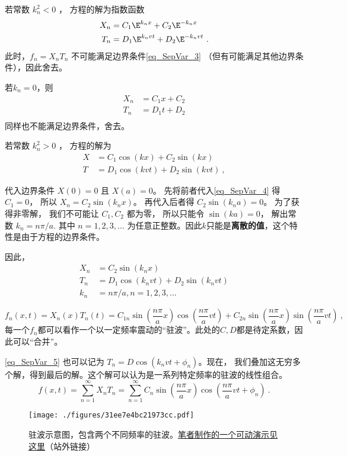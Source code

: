 若常数 $k_n^2 < 0$ ， 方程的解为指数函数
\begin{align}
X_n &= C_1 \E^{k_nx} + C_2 \E^{-k_nx}\\
T_n &= D_1 \E^{k_nvt} + D_2 \E^{-k_nvt}~.
\end{align}
此时，$f_n = X_nT_n$ 不可能满足边界条件\autoref{eq_SepVar_3}  （但有可能满足其他边界条件），因此舍去。

若$k_n=0$，则
\begin{align}
X_n &= C_1x+C_2\\
T_n &= D_1t+D_2\\
\end{align}
同样也不能满足边界条件，舍去。

若常数 $k_n^2 > 0$ ， 方程的解为
\begin{align}\label{eq_SepVar_4}
X &= C_1 \cos(kx) + C_2 \sin(kx)\\
T &= D_1 \cos(kvt) + D_2 \sin(kvt)~,
\end{align}

代入边界条件 $X(0) = 0$ 且 $X(a) = 0$。 先将前者代入\autoref{eq_SepVar_4} 得 $C_1 = 0$， 所以 $X_n = C_2\sin(k_nx)$。 再代入后者得 $C_2\sin(k_na) = 0$。 为了获得非零解， 我们不可能让 $C_1, C_2$ 都为零， 所以只能令 $\sin(ka) = 0$， 解出常数 $k_n = n\pi/a$. 其中 $n=1,2,3,...$ 为任意正整数。因此$k$只能是\textbf{离散的值}，这个特性是由于方程的边界条件。

因此，
\begin{align}
\label{eq_SepVar_5}X_n &= C_2 \sin(k_nx)\\
T_n &= D_1 \cos(k_nvt) + D_2 \sin(k_nvt)\\
k_n & = n\pi/a, n=1,2,3,...
\end{align}

\begin{equation}
f_n(x, t) = X_n(x) T_n(t) = C_{1n} \sin(\frac{n\pi}{a}x)\cos(\frac{n\pi}{a} vt) + C_{2n}\sin(\frac{n\pi}{a}x)\sin(\frac{n\pi}{a}vt)~,
\end{equation}
每一个$f_n$都可以看作一个以一定频率震动的“驻波”。此处的$C, D$都是待定系数，因此可以“合并”。

\autoref{eq_SepVar_5} 也可以记为 $T_n=D\cos(k_nvt+\phi_n)$。现在， 我们叠加这无穷多个解，得到最后的解。这个解可以认为是一系列特定频率的驻波的线性组合。
\begin{equation}
f(x, t) = \sum_{n=1}^\infty X_nT_n = \sum_{n=1}^\infty C_n\sin(\frac{n\pi}{a}x)\cos(\frac{n\pi}{a}vt + \phi_n)~.
\end{equation}

\begin{figure}[ht]
\centering
\texttt{[image: ./figures/31ee7e4bc21973cc.pdf]}
\caption{驻波示意图，包含两个不同频率的驻波。\href{https://www.geogebra.org/m/qc7nps6n}{笔者制作的一个可动演示见这里}（站外链接）} \label{fig_SepVar_1}
\end{figure}